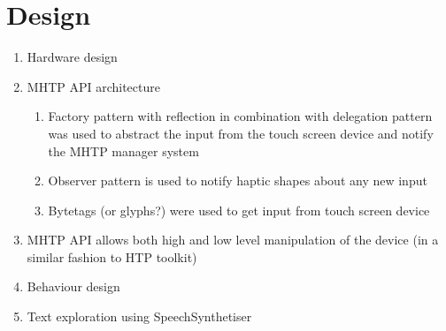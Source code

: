 \chapter*{Design}
\begin{enumerate}
	\item Hardware design
	\item MHTP API architecture
    	\begin{enumerate}
        	\item Factory pattern with reflection in combination with delegation pattern was used to abstract the input from the touch screen device and notify the MHTP manager system
            \item Observer pattern is used to notify haptic shapes about any new input
            \item Bytetags (or glyphs?) were used to get input from touch screen device
        \end{enumerate}
    \item MHTP API allows both high and low level manipulation of the device (in a similar fashion to HTP toolkit)
    \item Behaviour design
    \item Text exploration using SpeechSynthetiser
\end{enumerate}